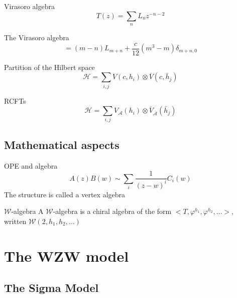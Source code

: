 \documentclass{beamer}
\begin{document}
\begin{frame}{Virasoro algebra}
    \begin{equation}
        T(z) = \sum_n L_n z^{-n-2}
    \end{equation}
    \begin{alertblock}{The Virasoro algebra}
        \begin{equation}
            [L_m, L_n] = (m-n)L_{m+n} + \frac{c}{12}(m^3-m)\delta_{m+n, 0}
        \end{equation}
    \end{alertblock}
    Partition of the Hilbert space
    \begin{equation}
        \mathcal{H} = \sum_{i, j} V(c, h_i) \otimes \overline{V}(c, \bar{h}_j)
    \end{equation}
\end{frame}

\begin{frame}{RCFTs} \Huge
    \begin{equation}
        \mathcal{H} = \sum_{i, j} V_{\mathcal{A}}(h_i) \otimes \overline{V}_{\bar{\mathcal{A}}}(\bar{h}_j)
    \end{equation}
\end{frame}


\subsection{Mathematical aspects}


\begin{frame}{OPE and algebra}
    \begin{equation}
        A(z)B(w) \sim \sum_i \frac{1}{(z-w)^i} C_i(w)
    \end{equation}
    The structure is called a \alert{vertex algebra}
    \begin{alertblock}{$\mathcal{W}$-algebra}
        A $\mathcal{W}$-algebra is a chiral algebra of the form $<T, \varphi^{h_1}, \varphi^{h_2}, \dots >$, written $\mathcal{W}(2, h_1, h_2, \dots)$
    \end{alertblock}
\end{frame}



\section{The WZW model}
\subsection{The Sigma Model}
\end{document}
